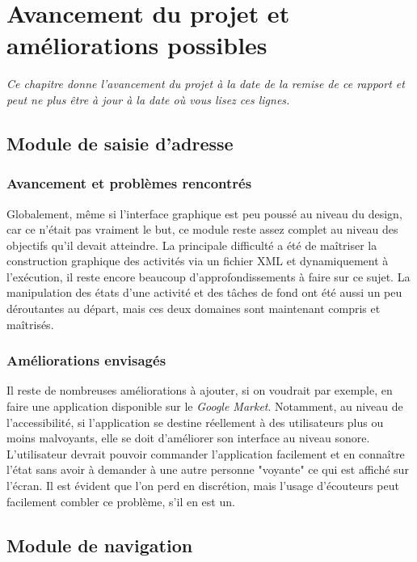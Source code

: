 \chapter{Avancement du projet et améliorations possibles}

\emph{Ce chapitre donne l'avancement du projet à la date de la remise de ce rapport et peut ne plus être à jour à la date où vous lisez ces lignes.}
\section{Module de saisie d'adresse}

\subsection{Avancement et problèmes rencontrés}
Globalement, même si l'interface graphique est peu poussé au niveau du design, car ce n'était pas vraiment le but, ce module reste assez complet au niveau des objectifs qu'il devait atteindre. La principale difficulté a été de maîtriser la construction graphique des activités via un fichier XML et dynamiquement à l'exécution, il reste encore beaucoup d'approfondissements à faire sur ce sujet. La manipulation des états d'une activité et des tâches de fond ont été aussi un peu déroutantes au départ, mais ces deux domaines sont maintenant compris et maîtrisés.

\subsection{Améliorations envisagés}
Il reste de nombreuses améliorations à ajouter, si on voudrait par exemple, en faire une application disponible sur le \textit{Google Market}. Notamment, au niveau de l'accessibilité, si l'application se destine réellement à des utilisateurs plus ou moins malvoyants, elle se doit d'améliorer son interface au niveau sonore. L'utilisateur devrait pouvoir commander l'application facilement et en connaître l'état sans avoir à demander à une autre personne "voyante" ce qui est affiché sur l'écran. Il est évident que l'on perd en discrétion, mais l'usage d'écouteurs peut facilement combler ce problème, s'il en est un.

\newpage
\section{Module de navigation}

